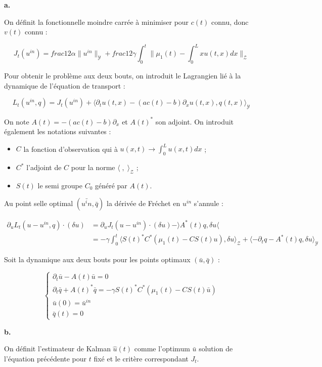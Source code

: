\documentclass[a4paper]{article}
\newcommand{\Y}{\mathscr{Y}}
\newcommand{\Z}{\mathscr{Z}}
\begin{document}
\textbf{a.}

On définit la fonctionnelle moindre carrée à minimiser pour $c(t)$ connu, donc $v(t)$ connu :

\[ J_t(u^{in}) = \displaystyle frac{1}{2}      
              \alpha \| u^{in} \|_{\Y} +  
			  \displaystyle frac{1}{2}      
			  \gamma \int_0^t \| \mu_1(t) - \int_0^L x u(t,x)dx \|_{\Z} \]

Pour obtenir le problème aux deux bouts, on introduit le Lagrangien lié à la dynamique de l'équation de transport :

\[ L_t(u^{in},q) = J_t(u^{in}) + \langle \partial_t u(t,x) - (ac(t)-b) \partial_x u(t,x), q(t,x) \rangle_{\Y} \]

On note $A(t) = - (ac(t)-b) \partial_x $ et $A(t)^*$ son adjoint.
On introduit également les notations suivantes :
\begin{itemize}
	\item $C$ la fonction d'observation qui à $u(x,t) \to \int_0^L u(x,t)dx$ ;
	\item $C^*$ l'adjoint de $C$ pour la norme $\langle \;, \; \rangle_{\Z}$ ;
	\item $S(t)$ le semi groupe $C_0$ généré par $A(t)$.
\end{itemize}
Au point selle optimal $(\bar{u^in}, \bar{q})$ la dérivée de Fréchet en $u^{in}$ s'annule :

\[ \begin{split}
\partial_{u}L_t(u-u^{in},q) \cdot (\delta u) &= \partial_u J_t(u-u^{in}) \cdot (\delta u)  - \rangle A^*(t)q , \delta u \langle \\
                                      &= - \gamma \int_0^t \langle S(t)^*C^* (\mu_1(t) - CS(t)u ), \delta u \rangle_{\Z} 
										 + \langle - \partial_t q - A^*(t)q , \delta u \rangle_{\Y}
\end{split}\]

Soit la dynamique aux deux bouts pour les points optimaux $(\bar{u},\bar{q})$ :

\[
\begin{cases}
	\partial_t \bar{u} - A(t)\bar{u} =0 \\
	\partial_t \bar{q} + A(t)^* \bar{q} = - \gamma S(t)^*C^* (\mu_1(t) - CS(t)\bar{u} ) \\
	\bar{u}(0) = \bar{u}^{in}\\
	\bar{q}(t) = 0
\end{cases}
\]
	
\textbf{b.}

On définit l'estimateur de Kalman $\hat{u}(t)$ 
comme l'optimum $\bar{u}$ solution de l'équation précédente pour $t$ fixé
et le critère correspondant $J_t$.
\end{document}
